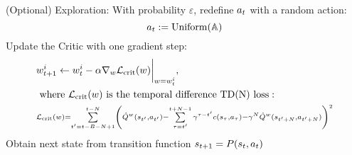 \documentclass[12pt,twoside]{../../mitthesis}
\begin{document}
\begin{algorithm}
\begin{algorithmic}[1]
            \STATE (Optional) Exploration: With probability $\varepsilon$, redefine $a_t$ with a random action:
            $$
                a_t := \operatorname{Uniform}(\mathbb A) 
            $$
            \STATE Update the Critic with one gradient step:
            \begin{equation}
                \label{eqn_critic_update}
                \begin{aligned}
                &w_{t+1}^i \gets w^i_{t} - \alpha \nabla_w\mathcal L_{{\text{crit}}}(w)\bigg\rvert_{w = w^i_{t}}, \\
                &\text{ where } \mathcal L_{{\text{crit}}}(w) \text{ is the temporal difference TD(N) loss}: \\
                &\scriptstyle {\mathcal L_{{\text{crit}}}(w) = \sum\limits_{t'=t-B-N+1}^{t - N}\left(\hat Q^w(s_{t'}, a_{t'}) - \sum\limits_{\tau=t'}^{t + N - 1} \gamma^{\tau-t'}c(s_{\tau}, a_{\tau}) - \gamma^{N}\hat Q^w(s_{t' + N}, a_{t' + N})\right)^2}
                \end{aligned}
            \end{equation}
            \STATE Obtain next state from transition function $s_{t+1} = P(s_t, a_t)$
        \ENDFOR
    \ENDFOR
    \end{algorithmic}
\end{algorithm}
\end{document}
